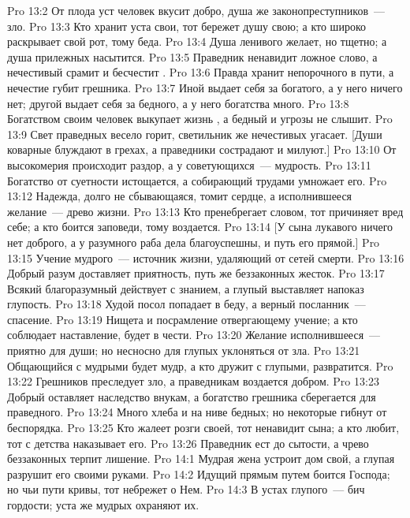 \vs Pro 13:2 От плода уст  человек вкусит добро, душа же законопреступников~--- зло.
\vs Pro 13:3 Кто хранит уста свои, тот бережет душу свою; а кто широко раскрывает свой рот, тому беда.
\vs Pro 13:4 Душа ленивого желает, но тщетно; а душа прилежных насытится.
\vs Pro 13:5 Праведник ненавидит ложное слово, а нечестивый срамит и бесчестит .
\vs Pro 13:6 Правда хранит непорочного в пути, а нечестие губит грешника.
\vs Pro 13:7 Иной выдает себя за богатого, а у него ничего нет; другой выдает себя за бедного, а у него богатства много.
\vs Pro 13:8 Богатством своим человек выкупает жизнь , а бедный и угрозы не слышит.
\vs Pro 13:9 Свет праведных весело горит, светильник же нечестивых угасает. [Души коварные блуждают в грехах, а праведники сострадают и милуют.]
\vs Pro 13:10 От высокомерия происходит раздор, а у советующихся~--- мудрость.
\vs Pro 13:11 Богатство от суетности истощается, а собирающий трудами умножает его.
\vs Pro 13:12 Надежда, долго не сбывающаяся, томит сердце, а исполнившееся желание~---  древо жизни.
\vs Pro 13:13 Кто пренебрегает словом, тот причиняет вред себе; а кто боится заповеди, тому воздается.
\vs Pro 13:14 [У сына лукавого ничего нет доброго, а у разумного раба дела благоуспешны, и путь его прямой.]
\vs Pro 13:15 Учение мудрого~--- источник жизни, удаляющий от сетей смерти.
\vs Pro 13:16 Добрый разум доставляет приятность, путь же беззаконных жесток.
\vs Pro 13:17 Всякий благоразумный действует с знанием, а глупый выставляет напоказ глупость.
\vs Pro 13:18 Худой посол попадает в беду, а верный посланник~--- спасение.
\vs Pro 13:19 Нищета и посрамление отвергающему учение; а кто соблюдает наставление, будет в чести.
\vs Pro 13:20 Желание исполнившееся~--- приятно для души; но несносно для глупых уклоняться от зла.
\vs Pro 13:21 Общающийся с мудрыми будет мудр, а кто дружит с глупыми, развратится.
\vs Pro 13:22 Грешников преследует зло, а праведникам воздается добром.
\vs Pro 13:23 Добрый оставляет наследство  внукам, а богатство грешника сберегается для праведного.
\vs Pro 13:24 Много хлеба  и на ниве бедных; но некоторые гибнут от беспорядка.
\vs Pro 13:25 Кто жалеет розги своей, тот ненавидит сына; а кто любит, тот с детства наказывает его.
\vs Pro 13:26 Праведник ест до сытости, а чрево беззаконных терпит лишение.
\vs Pro 14:1 Мудрая жена устроит дом свой, а глупая разрушит его своими руками.
\vs Pro 14:2 Идущий прямым путем боится Господа; но чьи пути кривы, тот небрежет о Нем.
\vs Pro 14:3 В устах глупого~--- бич гордости; уста же мудрых охраняют их.
